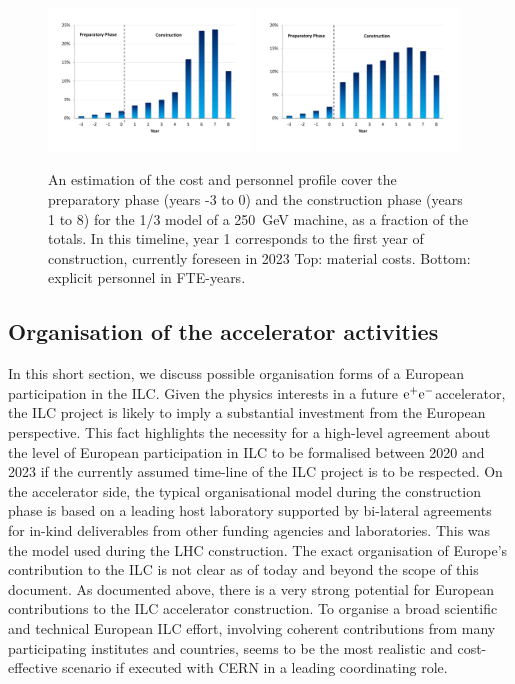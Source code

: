 \documentclass[%
 reprint,
 floatfix,
 amsmath,amssymb,
 aps,
]{revtex4-1}
\newcommand{\epem}{\mbox{${\rm e}^+{\rm e}^-$}}
\begin{document}
\begin{figure}[htbp]
\includegraphics[width=0.48\textwidth]{figures/ilc-eu-ikc-cost-profile-blue-250me.pdf}
\includegraphics[width=0.48\textwidth]{figures/ilc-eu-ikc-cost-profile-blue-fte.pdf}
\caption{\label{fig:costprofile:costprofile} An estimation of the cost and personnel profile cover the preparatory phase (years -3 to 0) 
and the construction phase (years 1 to 8) for the 1/3 model of a 250~GeV machine, as a fraction of the
totals. In this timeline, 
year 1 corresponds to the first year of construction, currently foreseen in 2023 
Top: material costs. Bottom: explicit personnel in FTE-years.
}
\end{figure}


\subsection{\label{sec:acc:org}Organisation of the accelerator activities}

In this short section, we discuss possible organisation forms of a European
participation in the ILC. 
Given the physics interests in a future \epem accelerator, the ILC project is likely to imply a substantial investment from
the European perspective. This fact highlights the necessity for a high-level
agreement about the level of European participation in ILC to be formalised between 2020
and 2023 if the currently assumed time-line of the ILC project is to be respected.
On the accelerator side, the typical organisational model during the construction phase is based on a leading host laboratory supported by 
bi-lateral agreements for in-kind deliverables from other funding agencies and laboratories. This was the model used during the LHC construction. 
The exact organisation of Europe's contribution to the ILC is not clear as of today and beyond the scope of this document. 
As documented above, there is a very strong potential for European contributions to the ILC accelerator construction.
To organise a broad scientific and technical European ILC effort, involving coherent contributions from many participating institutes and countries, 
seems to be the most realistic and cost-effective scenario if executed with CERN in a leading coordinating role.
\end{document}
